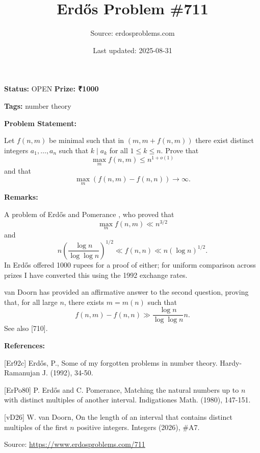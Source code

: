 \documentclass{article}
\title{Erd\H{o}s Problem \#711}
\date{Last updated: 2025-08-31}
\author{Source: erdosproblems.com}
\begin{document}
\maketitle

\noindent\textbf{Status:} OPEN \quad \textbf{Prize: ₹1000}

\noindent\textbf{Tags:} number theory

\medskip
\noindent\textbf{Problem Statement:}

Let $f(n,m)$ be minimal such that in $(m,m+f(n,m))$ there exist distinct integers $a_1,\ldots,a_n$ such that $k\mid a_k$ for all $1\leq k\leq n$. Prove that\[\max_m f(n,m) \leq n^{1+o(1)}\]and that\[\max_m (f(n,m)-f(n,n))\to \infty.\]

\bigskip
\noindent\textbf{Remarks:}

A problem of Erd\H{o}s and Pomerance \cite{ErPo80}, who proved that\[\max_m f(n,m) \ll n^{3/2}\]and\[n\left(\frac{\log n}{\log\log n}\right)^{1/2} \ll f(n,n)\ll n(\log n)^{1/2}.\]In \cite{Er92c} Erd\H{o}s offered 1000 rupees for a proof of either; for uniform comparison across prizes I have converted this using the 1992 exchange rates.

van Doorn \cite{vD26} has provided an affirmative answer to the second question, proving that, for all large $n$, there exists $m=m(n)$ such that\[f(n,m)-f(n,n) \gg \frac{\log n}{\log\log n}n.\]See also [710].

\bigskip
\noindent\textbf{References:}

[Er92c] Erd\H{o}s, P., Some of my forgotten problems in number theory. Hardy-Ramanujan J. (1992), 34-50.
 
 [ErPo80] P. Erd\H{o}s and C. Pomerance, Matching the natural numbers up to $n$ with distinct multiples of another interval. Indigationes Math. (1980), 147-151.
 
 [vD26] W. van Doorn, On the length of an interval that contains distinct multiples of the first $n$ positive integers. Integers (2026), #A7.

\bigskip
\noindent\small{Source: \url{https://www.erdosproblems.com/711}}
\end{document}
